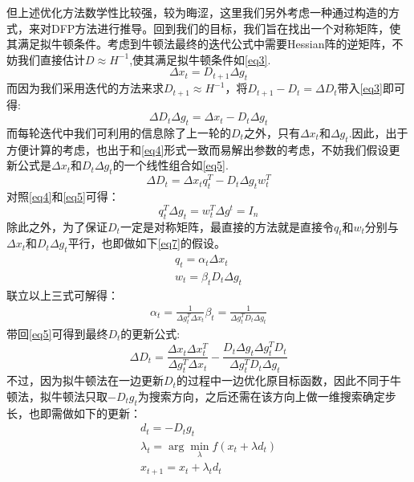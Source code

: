 \documentclass{SCIS2020cn}
\begin{document}
但上述优化方法数学性比较强，较为晦涩，这里我们另外考虑一种通过构造的方式，来对DFP方法进行推导。回到我们的目标，我们旨在找出一个对称矩阵，使其满足拟牛顿条件。考虑到牛顿法最终的迭代公式中需要Hessian阵的逆矩阵，不妨我们直接估计$D\approx H^{-1}$,使其满足拟牛顿条件如\ref{eq3}.
\begin{equation}
    \label{eq3}
    \Delta x_t=D_{t+1}\Delta g_t
\end{equation}
而因为我们采用迭代的方法来求$D_{t+1}\approx H^{-1}$，将$D_{t+1}-D_t=\Delta D_t$带入\ref{eq3}即可得:
\begin{equation}
    \label{eq4}
    \Delta D_{t}\Delta g_t=\Delta x_t -D_t\Delta g_t
\end{equation}
而每轮迭代中我们可利用的信息除了上一轮的$D_t$之外，只有$\Delta x_t$和$\Delta g_t$.因此，出于方便计算的考虑，也出于和\ref{eq4}形式一致而易解出参数的考虑，不妨我们假设更新公式是$\Delta x_t$和$D_t\Delta g_t$的一个线性组合如\ref{eq5}.
\begin{equation}
    \label{eq5}
    \Delta D_t=\Delta x_t q_t^T-D_t\Delta g_t w_t^T
\end{equation}
对照\ref{eq4}和\ref{eq5}可得：
\begin{equation}
    \label{eq6}
    q_t^T\Delta g_t=w^T_t\Delta g^t=I_n
\end{equation}
除此之外，为了保证$D_t$一定是对称矩阵，最直接的方法就是直接令$q_t$和$w_t$分别与$\Delta x_t$和$D_t\Delta g_t$平行，也即做如下\ref{eq7}的假设。
\begin{eqnarray}
    \label{eq7}
    q_t=\alpha_t \Delta x_t\\
    w_t=\beta_t D_t\Delta g_t
\end{eqnarray}
联立以上三式可解得：
\begin{eqnarray}
    \alpha_t=\frac{1}{\Delta g_t^T\Delta x_t}
    \beta_t=\frac{1}{\Delta g_t^TD_t\Delta g_t}
\end{eqnarray}
带回\ref{eq5}可得到最终$D_t$的更新公式:
\begin{equation}
    \Delta D_t=\frac{\Delta x_t\Delta x_t^T}{\Delta g_t^T\Delta x_t}-\frac{D_t\Delta g_t\Delta g_t^TD_t}{\Delta g_t^TD_t\Delta g_t}
\end{equation}
不过，因为拟牛顿法在一边更新$D_t$的过程中一边优化原目标函数，因此不同于牛顿法，拟牛顿法只取$-D_tg_t$为搜索方向，之后还需在该方向上做一维搜索确定步长，也即需做如下的更新：
\begin{eqnarray}
    d_t=-D_tg_t\\
    \lambda_t=\arg\min_\lambda f(x_t+\lambda d_t)\\
    x_{t+1}=x_t+\lambda_t d_t
\end{eqnarray}
\end{document}
